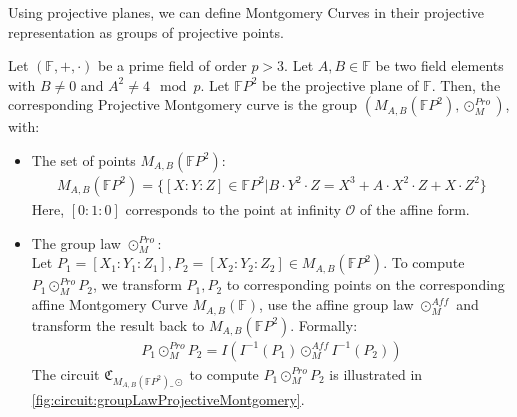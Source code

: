 Using projective planes, we can define Montgomery Curves in their projective representation as groups of projective points.

\begin{definition}
    Let $(\mathbb{F}, +, \cdot)$ be a prime field of order $p>3$. 
    Let $A, B\in\mathbb{F}$ be two field elements with $B\neq 0$ and $A^2\neq4 \mod p$.
    Let $\mathbb{F}P^2$ be the projective plane of $\mathbb{F}$.
    Then, the corresponding Projective Montgomery curve is the group $(M_{A,B}(\mathbb{F}P^2), \odot_M^{Pro})$, with:
    \begin{itemize}
        \item The set of points $M_{A,B}(\mathbb{F}P^2)$:
        \begin{align*}
            M_{A,B}(\mathbb{F}P^2)=\{[X:Y:Z]\in\mathbb{F}P^2|B\cdot Y^2\cdot Z=X^3+A\cdot X^2\cdot Z+X\cdot Z^2\}
        \end{align*}
        Here, $[0:1:0]$ corresponds to the point at infinity $\mathcal{O}$ of the affine form.
        \item The group law $\odot_M^{Pro}$:\\
        Let $P_1=[X_1:Y_1:Z_1], P_2=[X_2:Y_2:Z_2]\in M_{A,B}(\mathbb{F}P^2)$. 
        To compute $P_1\odot_M^{Pro} P_2$, we transform $P_1, P_2$ to corresponding points on the corresponding affine Montgomery Curve $M_{A,B}(\mathbb{F})$, use the affine group law $\odot_{M}^{Aff}$ and transform the result back to $M_{A,B}(\mathbb{F}P^2)$.
        Formally:
        {\setlength{\mathindent}{0pt}
        \begin{align*}
            P_1\odot_M^{Pro} P_2 = I(I^{-1}(P_1)\odot_M^{Aff}I^{-1}(P_2))
        \end{align*}
        }
        The circuit $\mathfrak{C}_{M_{A,B}(\mathbb{F}P^2)\_\odot}$ to compute $P_1\odot_M^{Pro} P_2$ is illustrated in \cref{fig:circuit:groupLawProjectiveMontgomery}.

\end{itemize}
\end{definition}
